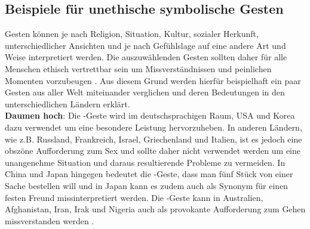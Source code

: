 





\subsection{Beispiele für unethische symbolische Gesten}
Gesten können je nach Religion, Situation, Kultur, sozialer Herkunft, unterschiedlicher Ansichten und je nach Gefühlslage auf eine andere Art und Weise interpretiert werden. Die auszuwählenden Gesten sollten daher für alle Menschen ethisch vertrettbar sein um Missverständnissen und peinlichen Momenten vorzubeugen \cite{gesten_liste_2020}. Aus diesem Grund werden hierfür beispielhaft ein paar Gesten aus aller Welt miteinander verglichen und deren Bedeutungen in den unterschiedlichen Ländern erklärt.\\

\textbf{Daumen hoch}: Die -Geste wird im deutschsprachigen Raum, USA und Korea dazu verwendet um eine besondere Leistung hervorzuheben. In anderen Ländern, wie z.B. Russland, Frankreich, Israel, Griechenland und Italien, ist es jedoch eine obszöne Aufforderung zum Sex und sollte daher nicht verwendet werden um eine unangenehme Situation und daraus resultierende Probleme zu vermeiden. In China und Japan hingegen bedeutet die -Geste, dass man fünf Stück von einer Sache bestellen will und in Japan kann es zudem auch als Synonym für einen festen Freund missinterpretiert werden. Die -Geste kann in Australien, Afghanistan, Iran, Irak und Nigeria auch als provokante Aufforderung zum Gehen missverstanden werden \cite{handzeichen_gesten_2018}.\\


